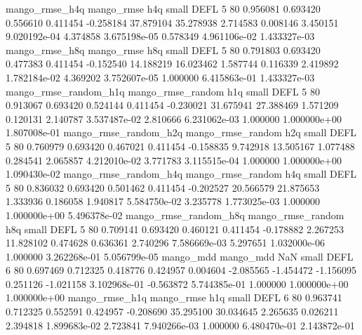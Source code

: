        mango_rmse_h4q        mango_rmse                  h4q      small     DEFL                 5 80 0.956081       0.693420 0.556610       0.411454   -0.258184     37.879104     35.278938     2.714583       0.008146  3.450151 9.020192e-04     4.374858   3.675198e-05            0.578349    4.961106e-02        1.433327e-03
       mango_rmse_h8q        mango_rmse                  h8q      small     DEFL                 5 80 0.791803       0.693420 0.477383       0.411454   -0.152540     14.188219     16.023462     1.587744       0.116339  2.419892 1.782184e-02     4.369202   3.752607e-05            1.000000    6.415863e-01        1.433327e-03
mango_rmse_random_h1q mango_rmse_random                  h1q      small     DEFL                 5 80 0.913067       0.693420 0.524144       0.411454   -0.230021     31.675941     27.388469     1.571209       0.120131  2.140787 3.537487e-02     2.810666   6.231062e-03            1.000000    1.000000e+00        1.807008e-01
mango_rmse_random_h2q mango_rmse_random                  h2q      small     DEFL                 5 80 0.760979       0.693420 0.467021       0.411454   -0.158835      9.742918     13.505167     1.077488       0.284541  2.065857 4.212010e-02     3.771783   3.115515e-04            1.000000    1.000000e+00        1.090430e-02
mango_rmse_random_h4q mango_rmse_random                  h4q      small     DEFL                 5 80 0.836032       0.693420 0.501462       0.411454   -0.202527     20.566579     21.875653     1.333936       0.186058  1.940817 5.584750e-02     3.235778   1.773025e-03            1.000000    1.000000e+00        5.496378e-02
mango_rmse_random_h8q mango_rmse_random                  h8q      small     DEFL                 5 80 0.709141       0.693420 0.460121       0.411454   -0.178882      2.267253     11.828102     0.474628       0.636361  2.740296 7.586669e-03     5.297651   1.032000e-06            1.000000    3.262268e-01        5.056799e-05
            mango_mdd         mango_mdd                  NaN      small     DEFL                 6 80 0.697469       0.712325 0.418776       0.424957    0.004604     -2.085565     -1.454472    -1.156095       0.251126 -1.021158 3.102968e-01    -0.563872   5.744385e-01            1.000000    1.000000e+00        1.000000e+00
       mango_rmse_h1q        mango_rmse                  h1q      small     DEFL                 6 80 0.963741       0.712325 0.552591       0.424957   -0.208690     35.295100     30.034645     2.265635       0.026211  2.394818 1.899683e-02     2.723841   7.940266e-03            1.000000    6.480470e-01        2.143872e-01
